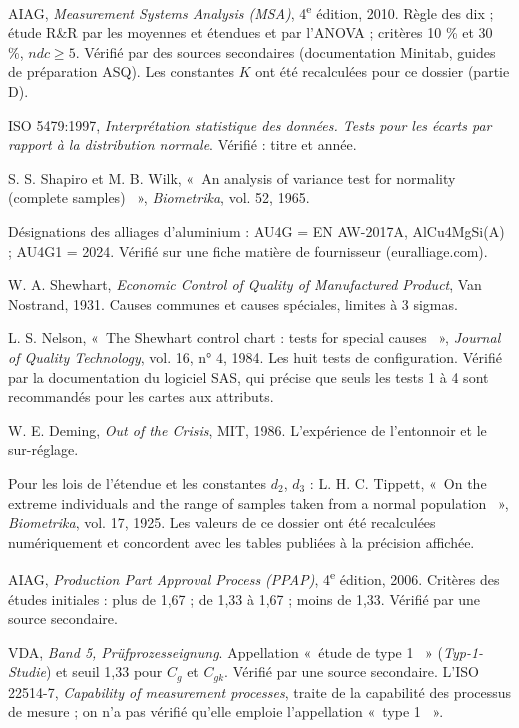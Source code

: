 \documentclass[11pt,a4paper]{article}
\providecommand{\og}{«~}\providecommand{\fg}{~»}
\begin{document}
\begin{enumerate}[label={[\arabic*]},leftmargin=2.2em,itemsep=2pt]
\item AIAG, \emph{Measurement Systems Analysis (MSA)}, 4\textsuperscript{e} édition, 2010. Règle des dix ; étude R\&R par les moyennes et étendues et par l'ANOVA ; critères 10 \% et 30 \%, $ndc\ge5$. Vérifié par des sources secondaires (documentation Minitab, guides de préparation ASQ). Les constantes $K$ ont été recalculées pour ce dossier (partie D).
\item ISO 5479:1997, \emph{Interprétation statistique des données. Tests pour les écarts par rapport à la distribution normale}. Vérifié : titre et année.
\item S. S. Shapiro et M. B. Wilk, \og An analysis of variance test for normality (complete samples) \fg, \emph{Biometrika}, vol. 52, 1965.
\item Désignations des alliages d'aluminium : AU4G = EN AW-2017A, AlCu4MgSi(A) ; AU4G1 = 2024. Vérifié sur une fiche matière de fournisseur (euralliage.com).
\item W. A. Shewhart, \emph{Economic Control of Quality of Manufactured Product}, Van Nostrand, 1931. Causes communes et causes spéciales, limites à 3 sigmas.
\item L. S. Nelson, \og The Shewhart control chart : tests for special causes \fg, \emph{Journal of Quality Technology}, vol. 16, n° 4, 1984. Les huit tests de configuration. Vérifié par la documentation du logiciel SAS, qui précise que seuls les tests 1 à 4 sont recommandés pour les cartes aux attributs.
\item W. E. Deming, \emph{Out of the Crisis}, MIT, 1986. L'expérience de l'entonnoir et le sur-réglage.
\item Pour les lois de l'étendue et les constantes $d_2$, $d_3$ : L. H. C. Tippett, \og On the extreme individuals and the range of samples taken from a normal population \fg, \emph{Biometrika}, vol. 17, 1925. Les valeurs de ce dossier ont été recalculées numériquement et concordent avec les tables publiées à la précision affichée.
\item AIAG, \emph{Production Part Approval Process (PPAP)}, 4\textsuperscript{e} édition, 2006. Critères des études initiales : plus de 1,67 ; de 1,33 à 1,67 ; moins de 1,33. Vérifié par une source secondaire.
\item VDA, \emph{Band 5, Prüfprozesseignung}. Appellation \og étude de type 1 \fg{} (\emph{Typ-1-Studie}) et seuil 1,33 pour $C_g$ et $C_{gk}$. Vérifié par une source secondaire. L'ISO 22514-7, \emph{Capability of measurement processes}, traite de la capabilité des processus de mesure ; on n'a pas vérifié qu'elle emploie l'appellation \og type 1 \fg.

\end{enumerate}
\end{document}
